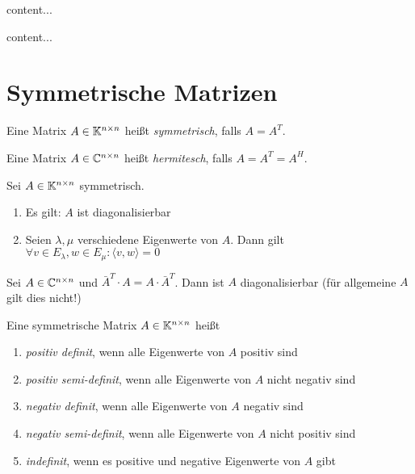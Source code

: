 \begin{definition}[Ähnlichkeitsabbildung]
	content...
\end{definition}

\begin{satz}
	content...
\end{satz}

\pagebreak

\section{Symmetrische Matrizen}
\begin{definition}
	Eine Matrix $A \in \mathbb{K}^{n \times n}$ heißt \emph{symmetrisch}, falls $A = A^T$.
\end{definition}

\begin{definition}
	Eine Matrix $A \in \mathbb{C}^{n \times n}$ heißt \emph{hermitesch}, falls $A = A^T = A^H$.
\end{definition}

\begin{satz}
	Sei $A \in \mathbb{K}^{n \times n}$ symmetrisch. 
	
	\begin{enumerate}[noitemsep]
		\item Es gilt: $A$ ist diagonalisierbar
		\item Seien $\lambda, \mu$ verschiedene Eigenwerte von $A$. Dann gilt $\forall v \in E_\lambda, w \in E_\mu : \langle v, w \rangle = 0 $
	\end{enumerate}
\end{satz}

\begin{satz}[Spektralsatz]
	Sei $A \in \mathbb{C}^{n \times n}$ und $\bar{A}^T \cdot A = A \cdot \bar{A}^T$. Dann ist $A$ diagonalisierbar (für allgemeine $A$ gilt dies nicht!)
\end{satz}

\begin{definition}
	Eine symmetrische Matrix $A \in \mathbb{K}^{n \times n}$ heißt
	\begin{enumerate}[noitemsep]
		\item \emph{positiv definit}, wenn alle Eigenwerte von $A$ positiv sind
		\item \emph{positiv semi-definit}, wenn alle Eigenwerte von $A$ nicht negativ sind	
		\item \emph{negativ definit}, wenn alle Eigenwerte von $A$ negativ sind
		\item \emph{negativ semi-definit}, wenn alle Eigenwerte von $A$ nicht positiv sind	
		\item \emph{indefinit}, wenn es positive und negative Eigenwerte von $A$ gibt
	\end{enumerate}
\end{definition}

